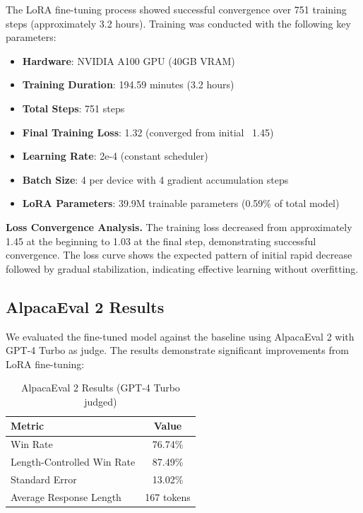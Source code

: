 \documentclass{assignment7_report}
\begin{document}
The LoRA fine-tuning process showed successful convergence over 751 training steps (approximately 3.2 hours). Training was conducted with the following key parameters:

\begin{itemize}
\item \textbf{Hardware}: NVIDIA A100 GPU (40GB VRAM)
\item \textbf{Training Duration}: 194.59 minutes (3.2 hours)
\item \textbf{Total Steps}: 751 steps
\item \textbf{Final Training Loss}: 1.32 (converged from initial ~1.45)
\item \textbf{Learning Rate}: 2e-4 (constant scheduler)
\item \textbf{Batch Size}: 4 per device with 4 gradient accumulation steps
\item \textbf{LoRA Parameters}: 39.9M trainable parameters (0.59\% of total model)
\end{itemize}

\textbf{Loss Convergence Analysis.} The training loss decreased from approximately 1.45 at the beginning to 1.03 at the final step, demonstrating successful convergence. The loss curve shows the expected pattern of initial rapid decrease followed by gradual stabilization, indicating effective learning without overfitting.


\subsection{AlpacaEval 2 Results}

We evaluated the fine-tuned model against the baseline using AlpacaEval 2 with GPT-4 Turbo as judge. The results demonstrate significant improvements from LoRA fine-tuning:

\begin{table}[h!]
\centering
\caption{AlpacaEval 2 Results (GPT-4 Turbo judged)}
\label{tab:alpaca_eval_results}
\begin{tabular}{@{}lc@{}}
\toprule
\textbf{Metric} & \textbf{Value} \\ \midrule
Win Rate & 76.74\% \\
Length-Controlled Win Rate & 87.49\% \\
Standard Error & 13.02\% \\
Average Response Length & 167 tokens \\ \bottomrule
\end{tabular}
\end{table}
\end{document}
